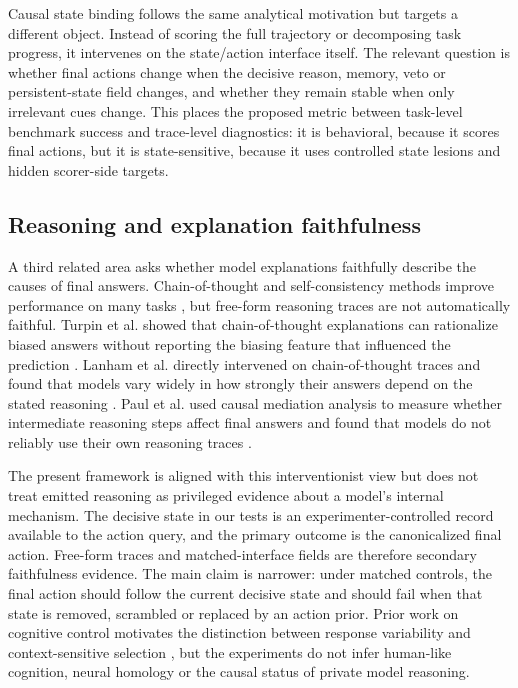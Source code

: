﻿\documentclass[preprint,12pt,authoryear]{elsarticle}
\begin{document}
Causal state binding follows the same analytical motivation but targets a different object. Instead of scoring the full trajectory or decomposing task progress, it intervenes on the state/action interface itself. The relevant question is whether final actions change when the decisive reason, memory, veto or persistent-state field changes, and whether they remain stable when only irrelevant cues change. This places the proposed metric between task-level benchmark success and trace-level diagnostics: it is behavioral, because it scores final actions, but it is state-sensitive, because it uses controlled state lesions and hidden scorer-side targets.

\subsection{Reasoning and explanation faithfulness}

A third related area asks whether model explanations faithfully describe the causes of final answers. Chain-of-thought and self-consistency methods improve performance on many tasks \citep{wei2022cot,wang2023selfconsistency}, but free-form reasoning traces are not automatically faithful. Turpin et al. showed that chain-of-thought explanations can rationalize biased answers without reporting the biasing feature that influenced the prediction \citep{turpin2023unfaithful}. Lanham et al. directly intervened on chain-of-thought traces and found that models vary widely in how strongly their answers depend on the stated reasoning \citep{lanham2023faithfulness}. Paul et al. used causal mediation analysis to measure whether intermediate reasoning steps affect final answers and found that models do not reliably use their own reasoning traces \citep{paul2024making}.

The present framework is aligned with this interventionist view but does not treat emitted reasoning as privileged evidence about a model's internal mechanism. The decisive state in our tests is an experimenter-controlled record available to the action query, and the primary outcome is the canonicalized final action. Free-form traces and matched-interface fields are therefore secondary faithfulness evidence. The main claim is narrower: under matched controls, the final action should follow the current decisive state and should fail when that state is removed, scrambled or replaced by an action prior. Prior work on cognitive control motivates the distinction between response variability and context-sensitive selection \citep{miller2001integrative,logan1984inhibit,aron2014inhibition,shenhav2013expected}, but the experiments do not infer human-like cognition, neural homology or the causal status of private model reasoning.
\end{document}
